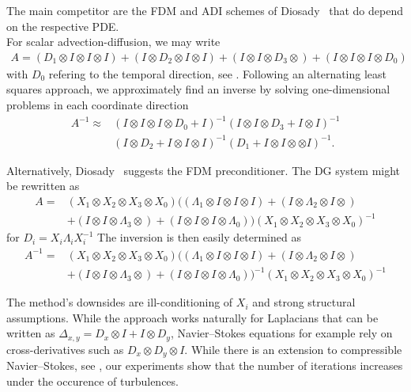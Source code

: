 \documentclass[12pt]{report}
\theoremstyle{remark}
\begin{document}
The main competitor are the FDM and ADI schemes of Diosady~\citep{diosady2017tensor} that do depend on the respective PDE. \\

For scalar advection-diffusion, we may write 
\begin{align*}
A = (D_1 \otimes I \otimes I \otimes I) + (I \otimes D_2 \otimes I \otimes I) + (I \otimes I \otimes D_3 \otimes) + (I \otimes I \otimes I \otimes D_0)
\end{align*}
with $D_0$ refering to the temporal direction, see \cite[Eq. 19]{diosady2017tensor}. Following an alternating least squares approach, we approximately find an inverse by solving one-dimensional problems in each coordinate direction
\begin{align*}
A^{-1} \approx &(I \otimes I \otimes I \otimes D_0 + I)^{-1} (I \otimes I \otimes D_3 + I \otimes I)^{-1} 
\\
&(I \otimes D_2 + I \otimes I \otimes I)^{-1} (D_1 + I \otimes I \otimes \otimes I)^{-1}.
\end{align*}

Alternatively, Diosady~\cite{diosady2017tensor} suggests the FDM preconditioner. The DG system might be rewritten as 
\begin{align*}
A = &(X_1 \otimes X_2 \otimes X_3 \otimes X_0) ( (\Lambda_1 \otimes I \otimes I \otimes I) + (I \otimes \Lambda_2 \otimes I \otimes) 
\\
&+ (I \otimes I \otimes \Lambda_3 \otimes) + (I \otimes I \otimes I \otimes \Lambda_0) ) (X_1 \otimes X_2 \otimes X_3 \otimes X_0)^{-1}
\end{align*}
for $D_i = X_i \Lambda_i X_i^{-1}$ The inversion is then easily determined as 
\begin{align*}
A^{-1} = &(X_1 \otimes X_2 \otimes X_3 \otimes X_0) ( (\Lambda_1 \otimes I \otimes I \otimes I) + (I \otimes \Lambda_2 \otimes I \otimes) 
\\
&+ (I \otimes I \otimes \Lambda_3 \otimes) + (I \otimes I \otimes I \otimes \Lambda_0) )^{-1} (X_1 \otimes X_2 \otimes X_3 \otimes X_0)^{-1}
\end{align*}

The method's downsides are ill-conditioning of $X_i$ and strong structural assumptions. While the approach works naturally for Laplacians that can be written as $\Delta_{x,y} = D_x \otimes I + I \otimes D_y$, Navier--Stokes equations for example rely on cross-derivatives such as $D_x \otimes D_y \otimes I$. While there is an extension to compressible Navier--Stokes, see \cite[Sec. 5]{diosady2017tensor}, our experiments show that the number of iterations increases under the occurence of turbulences. \\
\end{document}
